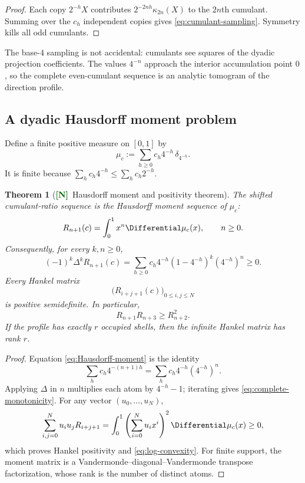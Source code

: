 \documentclass[11pt]{article}
\numberwithin{equation}{section}
\newtheorem{theorem}{Theorem}[section]
\theoremstyle{definition}
\theoremstyle{remark}
\newcommand{\New}{\textcolor{darkgreen}{\textsf{\textbf{[N]}}}}
\begin{document}
\begin{proof}
Each copy $2^{-h}X$ contributes
$2^{-2nh}\kappa_{2n}(X)$ to the $2n$th cumulant.  Summing over the $c_h$
independent copies gives \eqref{eq:cumulant-sampling}.  Symmetry kills all odd
cumulants.
\end{proof}

The base-$4$ sampling is not accidental: cumulants see squares of the dyadic
projection coefficients.  The values $4^{-n}$ approach the interior
accumulation point $0$, so the complete even-cumulant sequence is an analytic
tomogram of the direction profile.

\subsection{A dyadic Hausdorff moment problem}

Define a finite positive measure on $[0,1]$ by
\begin{equation}
 \mu_c:=\sum_{h\ge0}c_h4^{-h}\,\delta_{4^{-h}}.
 \label{eq:mu-c}
\end{equation}
It is finite because $\sum_hc_h4^{-h}\le\sum_hc_h2^{-h}$.

\begin{theorem}[\New\ Hausdorff moment and positivity theorem]
\label{thm:Hausdorff}
The shifted cumulant-ratio sequence is the Hausdorff moment sequence of
$\mu_c$:
\begin{equation}
 R_{n+1}(c)=\int_0^1x^n\Differential\mu_c(x),
 \qquad n\ge0.
 \label{eq:Hausdorff-moment}
\end{equation}
Consequently, for every $k,n\ge0$,
\begin{equation}
 (-1)^k\Delta^kR_{n+1}(c)
 =\sum_{h\ge0}c_h4^{-h}(1-4^{-h})^k(4^{-h})^n
 \ge0.
 \label{eq:complete-monotonicity}
\end{equation}
Every Hankel matrix
\begin{equation}
 \bigl(R_{i+j+1}(c)\bigr)_{0\le i,j\le N}
 \label{eq:Hankel}
\end{equation}
is positive semidefinite.  In particular,
\begin{equation}
 R_{n+1}R_{n+3}\ge R_{n+2}^2.
 \label{eq:log-convexity}
\end{equation}
If the profile has exactly $r$ occupied shells, then the infinite Hankel matrix
has rank $r$.
\end{theorem}

\begin{proof}
Equation \eqref{eq:Hausdorff-moment} is the identity
\[
 \sum_hc_h4^{-(n+1)h}
 =\sum_hc_h4^{-h}(4^{-h})^n.
\]
Applying $\Delta$ in $n$ multiplies each atom by $4^{-h}-1$; iterating gives
\eqref{eq:complete-monotonicity}.  For any vector $(u_0,\ldots,u_N)$,
\[
 \sum_{i,j=0}^Nu_iu_jR_{i+j+1}
 =\int_0^1\left(\sum_{i=0}^Nu_ix^i\right)^2\Differential\mu_c(x)\ge0,
\]
which proves Hankel positivity and \eqref{eq:log-convexity}.  For finite
support, the moment matrix is a Vandermonde--diagonal--Vandermonde transpose
factorization, whose rank is the number of distinct atoms.
\end{proof}
\end{document}
